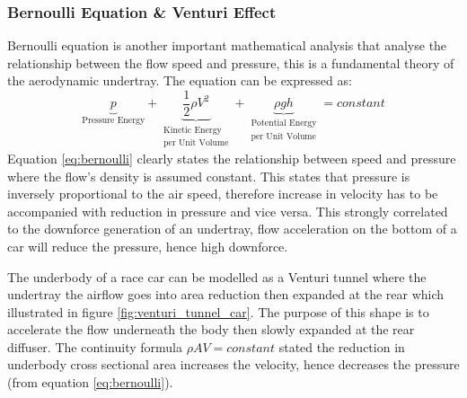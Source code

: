 \subsubsection{Bernoulli Equation \& Venturi Effect}
Bernoulli equation is another important mathematical analysis that analyse the relationship between the flow speed and pressure, this is a fundamental theory of the aerodynamic undertray. The equation can be expressed as:
\begin{equation}
   \underbrace{p}_\textrm{Pressure Energy} + \underbrace{\frac{1}{2} \rho V^{2}}_{\substack{\text{Kinetic Energy} \\ \text{per Unit Volume}}} + \underbrace{\rho g h}_{\substack{\text{Potential Energy} \\ \text{per Unit Volume}}} = constant
    \label{eq:bernoulli}
\end{equation}
Equation \ref{eq:bernoulli} clearly states the relationship between speed and pressure where the flow's density is assumed constant. This states that pressure is inversely proportional to the air speed, therefore increase in velocity has to be accompanied with reduction in pressure and vice versa. This strongly correlated to the downforce generation of an undertray, flow acceleration on the bottom of a car will reduce the pressure, hence high downforce.

\noindent The underbody of a race car can be modelled as a Venturi tunnel where the undertray the airflow goes into area reduction then expanded at the rear which illustrated in figure \ref{fig:venturi_tunnel_car}. The purpose of this shape is to accelerate the flow underneath the body then slowly expanded at the rear diffuser. The continuity formula $\rho AV = constant$ stated the reduction in underbody cross sectional area increases the velocity, hence decreases the pressure (from equation \ref{eq:bernoulli}).

